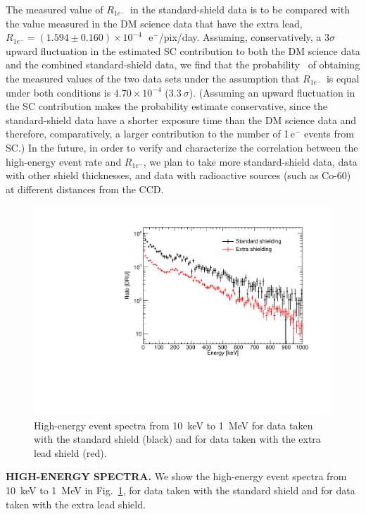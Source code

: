 \documentclass[aps,prl,twocolumn,showpacs,superscriptaddress,preprintnumbers]{revtex4-1}
\newcommand{\unit}[1]{\ensuremath{\mathrm{\,#1}}\xspace}
\newcommand{\e}{\unit{e^{-}}}
\newcommand{\Rs}{$R_{1e^-}$}
\begin{document}
The measured value of \Rs\ in the standard-shield data is to be compared with the
value measured in the DM science data that have the extra lead, $R_{1e^-}=(1.594 \pm 0.160)\times 10^{-4}$~\e/pix/day. 
Assuming, conservatively, a $3\sigma$ upward fluctuation in the estimated SC contribution to both the DM science data and the combined standard-shield data, we find that the probability~\cite{KRISHNAMOORTHY200423} of obtaining the measured values of the two data sets under the assumption that \Rs\ is equal under both conditions is $4.70\times 10^{-4}$ ($3.3~\sigma$). (Assuming an upward fluctuation in the SC contribution makes the probability estimate conservative, since the standard-shield data have a shorter exposure time than the DM science data and therefore, comparatively, a larger contribution to the number of 1\e events from SC.) 
In the future, in order to verify and characterize the correlation between the high-energy event rate and \Rs, we plan to take more standard-shield data, data with other shield thicknesses, and data with radioactive sources (such as Co-60) at different distances from the CCD. 


\begin{figure}[t!]
\begin{center}
\includegraphics[width=0.99\textwidth]{figs/HEspectra.pdf}
\caption{High-energy event spectra from 10~keV to 1~MeV for data taken with the standard shield (black) and for data taken with the extra lead shield (red). 
\vspace{-5mm}
}
\label{fig:HEspectra}
\end{center}
\end{figure}

\vskip 3mm
\noindent \textbf{HIGH-ENERGY SPECTRA.}
We show the high-energy event spectra from 10~keV to 1~MeV in Fig.~\ref{fig:HEspectra}, for data taken with the standard shield and for data taken with the extra lead shield. 
\end{document}
